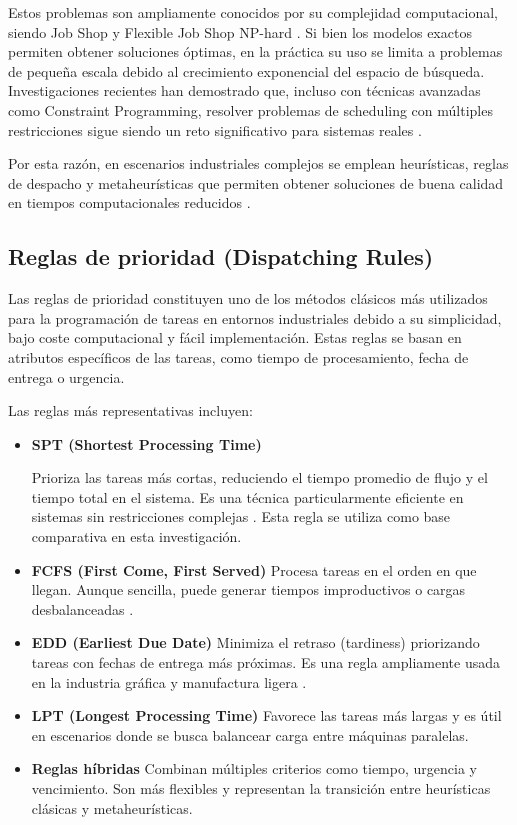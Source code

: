 Estos problemas son ampliamente conocidos por su complejidad computacional, siendo Job Shop y Flexible Job Shop NP-hard \cite{flowshop,flexjobshop}. Si bien los modelos exactos permiten obtener soluciones óptimas, en la práctica su uso se limita a problemas de pequeña escala debido al crecimiento exponencial del espacio de búsqueda. Investigaciones recientes han demostrado que, incluso con técnicas avanzadas como Constraint Programming, resolver problemas de scheduling con múltiples restricciones sigue siendo un reto significativo para sistemas reales \cite{teppan2022}.

Por esta razón, en escenarios industriales complejos se emplean heurísticas, reglas de despacho y metaheurísticas que permiten obtener soluciones de buena calidad en tiempos computacionales reducidos \cite{meisel2010}.

\subsection{Reglas de prioridad (Dispatching Rules)}

Las reglas de prioridad constituyen uno de los métodos clásicos más utilizados para la programación de tareas en entornos industriales debido a su simplicidad, bajo coste computacional y fácil implementación. Estas reglas se basan en atributos específicos de las tareas, como tiempo de procesamiento, fecha de entrega o urgencia.

Las reglas más representativas incluyen:
\begin{itemize}
    \item \textbf{SPT (Shortest Processing Time)} \begin{sloppypar}Prioriza las tareas más cortas, reduciendo el tiempo promedio de flujo y el tiempo total en el sistema. Es una técnica particular\-mente eficiente en sistemas sin res\-tric\-ciones complejas \cite{flowshop}. Esta regla se utiliza como base comparativa en esta investigación.\end{sloppypar}
    \item \textbf{FCFS (First Come, First Served)} Procesa tareas en el orden en que llegan. Aunque sencilla, puede generar tiempos improductivos o cargas desbalanceadas \cite{flexjobshop}.
    \item \textbf{EDD (Earliest Due Date)} Minimiza el retraso (tardiness) priorizando tareas con fechas de entrega más próximas. Es una regla ampliamente usada en la industria gráfica y manufactura ligera \cite{meisel2010}.
    \item \textbf{LPT (Longest Processing Time)} Favorece las tareas más largas y es útil en escenarios donde se busca balancear carga entre máquinas paralelas.
    \item \textbf{Reglas híbridas} Combinan múltiples criterios como tiempo, urgencia y vencimiento. Son más flexibles y representan la transición entre heurísticas clásicas y metaheurísticas.
\end{itemize}

